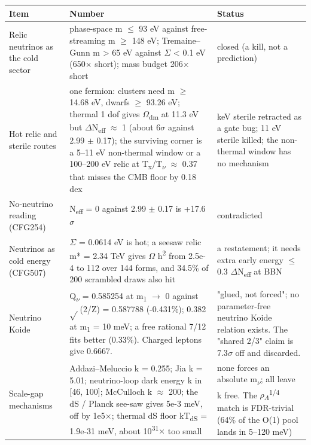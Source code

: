 \documentclass[10pt]{article}
\begin{document}
{\footnotesize\begin{longtable}{>{\raggedright\arraybackslash}p{\dimexpr(\linewidth-6\tabcolsep)/3\relax}>{\raggedright\arraybackslash}p{\dimexpr(\linewidth-6\tabcolsep)/3\relax}>{\raggedright\arraybackslash}p{\dimexpr(\linewidth-6\tabcolsep)/3\relax}}
\toprule
\textbf{Item} & \textbf{Number} & \textbf{Status} \\
\midrule
\endhead
Relic neutrinos as the cold sector & phase-space m \ensuremath{\leq} 93 eV against free-streaming m \ensuremath{\geq} 148 eV; Tremaine--Gunn m > 65 eV against \ensuremath{\Sigma} < 0.1 eV (650\ensuremath{\times} short); mass budget 206\ensuremath{\times} short & closed (a kill, not a prediction) \\
Hot relic and sterile routes & one fermion: clusters need m \ensuremath{\geq} 14.68 eV, dwarfs \ensuremath{\geq} 93.26 eV; thermal 1 dof gives \ensuremath{\Omega}\textsubscript{dm} at 11.3 eV but \ensuremath{\Delta}N\textsubscript{eff} \ensuremath{\approx} 1 (about 6\ensuremath{\sigma} against 2.99 \ensuremath{\pm} 0.17); the surviving corner is a 5--11 eV non-thermal window or a 100--200 eV relic at T\textsubscript{x}/T\textsubscript{\ensuremath{\nu}} \ensuremath{\approx} 0.37 that misses the CMB floor by 0.18 dex & keV sterile retracted as a gate bug; 11 eV sterile killed; the non-thermal window has no mechanism \\
No-neutrino reading (CFG254) & N\textsubscript{eff} = 0 against 2.99 \ensuremath{\pm} 0.17 is +17.6\ensuremath{\sigma} & contradicted \\
Neutrinos as cold energy (CFG507) & \ensuremath{\Sigma} = 0.0614 eV is hot; a seesaw relic m* = 2.34 TeV gives \ensuremath{\Omega} h\textsuperscript{2} from 2.5e-4 to 112 over 144 forms, and 34.5\% of 200 scrambled draws also hit & a restatement; it needs extra early energy \ensuremath{\leq} 0.3 \ensuremath{\Delta}N\textsubscript{eff} at BBN \\
Neutrino Koide & Q\textsubscript{\ensuremath{\nu}} = 0.585254 at m\textsubscript{1} \ensuremath{\rightarrow} 0 against \ensuremath{\sqrt{\,}}(2/Z) = 0.587788 (-0.431\%); 0.382 at m\textsubscript{1} = 10 meV; a free rational 7/12 fits better (0.33\%). Charged leptons give 0.6667. & "glued, not forced"; no parameter-free neutrino Koide relation exists. The "shared 2/3" claim is 7.3\ensuremath{\sigma} off and discarded. \\
Scale-gap mechanisms & Addazi--Meluccio k = 0.255; Jia k = 5.01; neutrino-loop dark energy k in [46, 100]; McCulloch k \ensuremath{\approx} 200; the dS / Planck see-saw gives 5e-3 meV, off by 1e5\ensuremath{\times}; thermal dS floor kT\textsubscript{dS} = 1.9e-31 meV, about 10\textsuperscript{31}\ensuremath{\times} too small & none forces an absolute m\textsubscript{\ensuremath{\nu}}; all leave k free. The \ensuremath{\rho}\textsubscript{\ensuremath{\Lambda}}\textsuperscript{1/4} match is FDR-trivial (64\% of the O(1) pool lands in 5--120 meV) \\

\end{longtable}}
\end{document}
